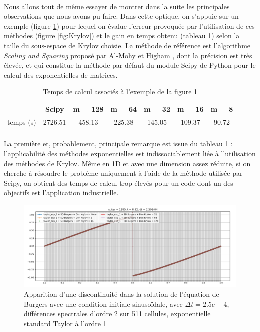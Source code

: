         \paragraph{}
        Nous allons tout de même essayer de montrer dans la suite les principales observations que nous avons pu faire. Dans cette optique, on s'appuie sur un exemple (figure \ref{fig:BurgersKrylov}) pour lequel on évalue l'erreur provoquée par l'utilisation de ces méthodes (figure \ref{fig:Krylov}) et le gain en temps obtenu (tableau \ref{tab:Krylov}) selon la taille du sous-espace de Krylov choisie. La méthode de référence est l'algorithme \textit{Scaling and Squaring} proposé par Al-Mohy et Higham \cite{scipy}, dont la précision est très élevée, et qui constitue la méthode par défaut du module Scipy de Python pour le calcul des exponentielles de matrices. 
        \begin{table}[h!]
            \centering
            \begin{tabular}{c|c|c|c|c|c|c|}
                \rowcolor{gray} \cellcolor[gray]{1.0}\, & Scipy & m = 128 & m = 64 & m = 32 & m = 16 & m = 8 \\ \hline
                \cellcolor[gray]{0.75}temps (s) & 2726.51 & 458.13 & 225.38 & 145.05 & 109.37 & 90.72 \\ \hline
            \end{tabular}
            \caption{Temps de calcul associés à l'exemple de la figure \ref{fig:BurgersKrylov}}
            \label{tab:Krylov}
        \end{table}

        \paragraph{}
        La première et, probablement, principale remarque est issue du tableau \ref{tab:Krylov} : l'applicabilité des méthodes exponentielles est indissociablement liée à l'utilisation des méthodes de Krylov. Même en 1D et avec une dimension assez réduite, si on cherche à résoudre le problème uniquement à l'aide de la méthode utilisée par Scipy, on obtient des temps de calcul trop élevés pour un code dont un des objectifs est l'application industrielle.

        \begin{figure}[h!]
            \centering
            \includegraphics[width=\textwidth]{images/krylov_burgers.png}
            \caption{Apparition d'une discontinuité dans la solution de l'équation de Burgers avec une condition initiale sinusoïdale, avec $\Delta t = 2.5e-4$, différences spectrales d'ordre 2 sur 511 cellules, exponentielle standard Taylor à l'ordre 1}
            \label{fig:BurgersKrylov}
        \end{figure}

